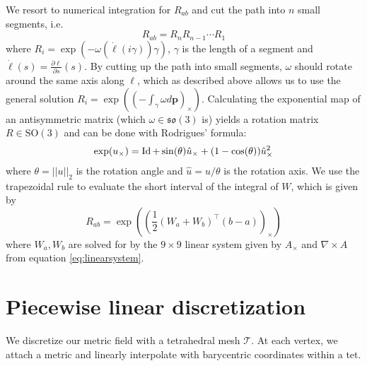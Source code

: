 \documentclass[../thesis.tex]{subfiles}
\begin{document}
We resort to numerical integration for $R_{ab}$ and cut the path into $n$ small segments, i.e.
$$R_{ab}= R_nR_{n-1} \dotsb R_1$$
where $R_i = \exp(-\omega (\dot{\ell}(i\gamma))\gamma)$, $\gamma$ is the length of a segment and $\dot{\ell}(s)=\frac{\partial \ell}{\partial s}(s)$.
By cutting up the path into small segments, $\omega$ should rotate around the same axis along $\ell$, which as described above
allows us to use the general solution $R_{i}=\exp((-\int_{\gamma} \omega d\bm{p})_{\times})$.
Calculating the exponential map of an antisymmetric matrix (which $\omega \in \mathfrak{so}(3)$ is) yields a
rotation matrix $R\in \mathrm{SO}(3)$ and can be done with Rodrigues' formula:
$$\exp(u_{\times}) = \operatorname{Id} + \sin(\theta) \hat{u}_{\times} + (1-\cos(\theta)) \hat{u}_{\times}^2$$
where $\theta = ||u||_2$ is the rotation angle and $\hat{u}= u/\theta$ is the rotation axis.
We use the trapezoidal rule to evaluate the short interval of the integral of $W$, which is given by
$$R_{ab}=\exp \left( \left(\frac{1}{2}(W_a + W_b)^{\top}(b-a)\right)_{\times}\right)$$
where $W_a, W_b$ are solved for by the $9\times9$ linear system given by $A_{\times}$ and $\nabla \times A$ from equation \ref{eq:linearsystem}.


\section{Piecewise linear discretization}
We discretize our metric field with a tetrahedral mesh $\mathcal{T}$.
At each vertex, we attach a metric and linearly interpolate with barycentric coordinates within a tet.
\end{document}
